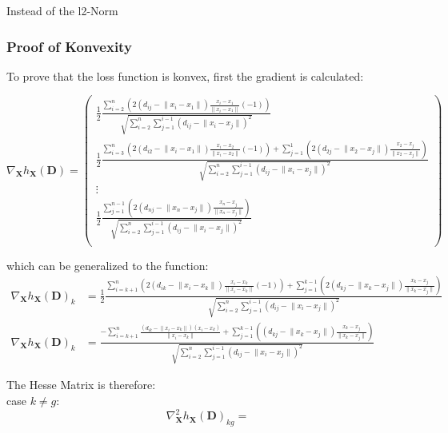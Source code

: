 Instead of the l2-Norm

\subsubsection{Proof of Konvexity}
To prove that the loss function is konvex, first the gradient is calculated:

\begin{equation}
    \nabla_{\bm{X}} h_{\bm{X}}(\bm{D}) = \begin{pmatrix}
    \frac{1}{2} 
    \frac{\sum_{i=2}^{n} (2(d_{ij} - \lVert x_i - x_1 \rVert) \frac{x_i - x_1}{\lVert x_i - x_1 \rVert} (-1))}
{\sqrt{\sum_{i=2}^{n} \sum_{j=1}^{i-1} \left(d_{ij} - \lVert x_i - x_j \rVert \right)^2}}\\    \frac{1}{2} 
    \frac{\sum_{i=3}^{n} (2(d_{i2} - \lVert x_i - x_1 \rVert) \frac{x_i - x_2}{\lVert x_i - x_2 \rVert} (-1)) + \sum_{j=1}^{1} (2(d_{2j} - \lVert x_2 - x_j \rVert) \frac{x_2 - x_j}{\lVert x_2 - x_j \rVert})}
    {\sqrt{\sum_{i=2}^{n} \sum_{j=1}^{i-1} \left(d_{ij} - \lVert x_i - x_j \rVert \right)^2}}\\ 
    \vdots \\
    \frac{1}{2} 
    \frac{\sum_{j=1}^{n-1} (2(d_{nj} - \lVert x_n - x_j \rVert) \frac{x_n - x_j}{\lVert x_n - x_j \rVert})}
    {\sqrt{\sum_{i=2}^{n} \sum_{j=1}^{i-1} \left(d_{ij} - \lVert x_i - x_j \rVert \right)^2}}\\ 

    \end{pmatrix}
\end{equation}


which can be generalized to the function:
\begin{align}
    \nabla_{\bm{X}} h_{\bm{X}}(\bm{D})_k &= \frac{1}{2} 
    \frac{\sum_{i=k+1}^{n} (2(d_{ik} - \lVert x_i - x_k \rVert) \frac{x_i - x_k}{\lVert x_i - x_k \rVert} (-1)) + \sum_{j=1}^{k-1} (2(d_{kj} - \lVert x_k - x_j \rVert) \frac{x_k - x_j}{\lVert x_k - x_j \rVert})}
    {\sqrt{\sum_{i=2}^{n} \sum_{j=1}^{i-1} \left(d_{ij} - \lVert x_i - x_j \rVert \right)^2}}\\
    \nabla_{\bm{X}} h_{\bm{X}}(\bm{D})_k &=
    \frac{-\sum_{i=k+1}^{n} \frac{(d_{ik} - \lVert x_i - x_k \rVert)(x_i - x_k)}{\lVert x_i - x_k \rVert} + \sum_{j=1}^{k-1} ((d_{kj} - \lVert x_k - x_j \rVert) \frac{x_k - x_j}{\lVert x_k - x_j \rVert})}
    {\sqrt{\sum_{i=2}^{n} \sum_{j=1}^{i-1} \left(d_{ij} - \lVert x_i - x_j \rVert \right)^2}}
\end{align}


The Hesse Matrix is therefore:\\
case $k \ne g$:
\begin{equation}
    \nabla^2_{\bm{X}} h_{\bm{X}}(\bm{D})_{kg} = 
\end{equation}